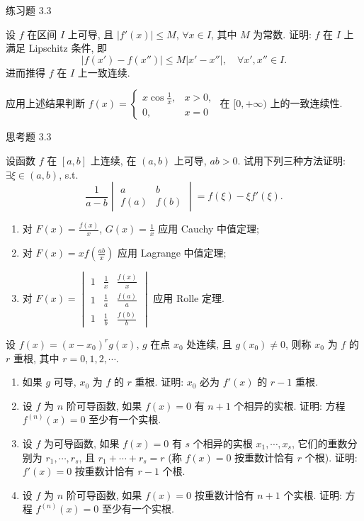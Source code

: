 \begin{exblock}{练习题 3.3}
  \item 设 $f$ 在区间 $I$ 上可导, 且 $|f'(x)|\leqslant M$, $\forall x\in I$, 其中 $M$ 为常数. 证明: $f$ 在 $I$ 上满足 Lipschitz 条件, 即
  \[
  |f(x')-f(x'')|\leqslant M|x'-x''|,\quad\forall x',x''\in I.
\]
  进而推得 $f$ 在 $I$ 上一致连续.

  应用上述结果判断 $f(x)=\begin{cases}x\cos\frac{1}{x},&x>0,\\ 0,&x=0\end{cases}$ 在 $[0,+\infty)$ 上的一致连续性.
\end{exblock}

\begin{exblock}{思考题 3.3}
  \item 设函数 $f$ 在 $[a,b]$ 上连续, 在 $(a,b)$ 上可导, $ab>0$. 试用下列三种方法证明: $\exists\xi\in(a,b)$, s.t.
  \[
  \frac{1}{a-b}\begin{vmatrix}a&b\\ f(a)&f(b)\end{vmatrix}=f(\xi)-\xi f'(\xi).
\]
  \begin{enumerate}[label=(\arabic*)]
    \item 对 $F(x)=\frac{f(x)}{x}$, $G(x)=\frac{1}{x}$ 应用 Cauchy 中值定理;
    \item 对 $F(x)=xf\left(\frac{ab}{x}\right)$ 应用 Lagrange 中值定理;
    \item 对 $F(x)=\begin{vmatrix}1&\frac{1}{x}&\frac{f(x)}{x}\\ 1&\frac{1}{a}&\frac{f(a)}{a}\\ 1&\frac{1}{b}&\frac{f(b)}{b}\end{vmatrix}$ 应用 Rolle 定理.
  \end{enumerate}

  \item 设 $f(x)=(x-x_0)^{r}g(x)$, $g$ 在点 $x_0$ 处连续, 且 $g(x_0)\neq0$, 则称 $x_0$ 为 $f$ 的 $r$ 重根, 其中 $r=0,1,2,\cdots$.
  \begin{enumerate}[label=(\arabic*)]
    \item 如果 $g$ 可导, $x_0$ 为 $f$ 的 $r$ 重根. 证明: $x_0$ 必为 $f'(x)$ 的 $r-1$ 重根.
    \item 设 $f$ 为 $n$ 阶可导函数, 如果 $f(x)=0$ 有 $n+1$ 个相异的实根. 证明: 方程 $f^{(n)}(x)=0$ 至少有一个实根.
    \item 设 $f$ 为可导函数, 如果 $f(x)=0$ 有 $s$ 个相异的实根 $x_1,\cdots,x_s$, 它们的重数分别为 $r_1,\cdots,r_s$, 且 $r_1+\cdots+r_s=r$ (称 $f(x)=0$ 按重数计恰有 $r$ 个根). 证明: $f'(x)=0$ 按重数计恰有 $r-1$ 个根.
    \item 设 $f$ 为 $n$ 阶可导函数, 如果 $f(x)=0$ 按重数计恰有 $n+1$ 个实根. 证明: 方程 $f^{(n)}(x)=0$ 至少有一个实根.
  \end{enumerate}


\end{exblock}
